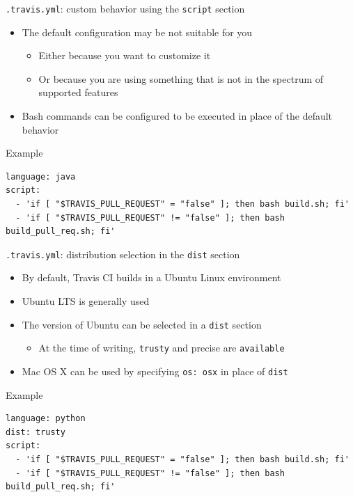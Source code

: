 \documentclass[presentation]{beamer}
\begin{document}
\begin{frame}[fragile]{\texttt{.travis.yml}: custom behavior using the \texttt{script} section}
    \begin{itemize}
        \item The default configuration may be not suitable for you
        \begin{itemize}
            \item Either because you want to customize it
            \item Or because you are using something that is not in the spectrum of supported features
        \end{itemize}
        \item Bash commands can be configured to be executed in place of the default behavior
    \end{itemize}
    \begin{block}{Example}
        \begin{verbatim}
language: java
script:
  - 'if [ "$TRAVIS_PULL_REQUEST" = "false" ]; then bash build.sh; fi'
  - 'if [ "$TRAVIS_PULL_REQUEST" != "false" ]; then bash build_pull_req.sh; fi'
        \end{verbatim}
    \end{block}
\end{frame}

\begin{frame}[fragile]{\texttt{.travis.yml}: distribution selection in the \texttt{dist} section}
    \begin{itemize}
        \item By default, Travis CI builds in a Ubuntu Linux environment
        \item Ubuntu LTS is generally used
        \item The version of Ubuntu can be selected in a \texttt{dist} section
        \begin{itemize}
            \item At the time of writing, \texttt{trusty} and precise are \texttt{available}
        \end{itemize}
        \item Mac OS X can be used by specifying \texttt{os: osx} in place of \texttt{dist}
    \end{itemize}
    \begin{block}{Example}
        \begin{verbatim}
language: python
dist: trusty
script:
  - 'if [ "$TRAVIS_PULL_REQUEST" = "false" ]; then bash build.sh; fi'
  - 'if [ "$TRAVIS_PULL_REQUEST" != "false" ]; then bash build_pull_req.sh; fi'
        \end{verbatim}
    \end{block}
\end{frame}
\end{document}

